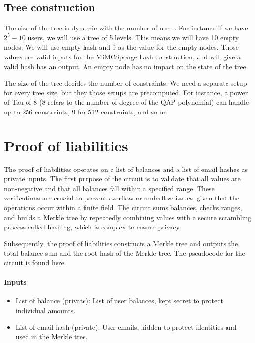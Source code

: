 \subsection{Tree construction}
The size of the tree is dynamic with the number of users. For instance if we have $2^5 - 10$ users, we will use a tree of 5 levels. This means we will
have 10 empty nodes. We will use empty hash and 0 as the value for the empty nodes. Those values are valid inputs for the MiMCSponge hash construction,
and will give a valid hash has an output. An empty node has no impact on the state of the tree.

The size of the tree decides the number of constraints. We need a separate setup for every tree size, but they those setups are precomputed. 
For instance, a power of Tau of 8 (8 refers to the number of degree of the QAP polynomial) can handle up to 256 constraints, 9 for 512 constraints, and so on.


\section{Proof of liabilities}
\label{subsec:pl}
The proof of liabilities operates on a list of balances and a list of email hashes as private inputs.
The first purpose of the circuit is to validate that all values are non-negative and that all balances fall within a specified range.
These verifications are crucial to prevent overflow or underflow issues, given that the operations occur within a finite field. 
The circuit sums balances, checks ranges, and builds a Merkle tree by repeatedly combining values with a secure scrambling process called hashing, which is complex to ensure privacy.

Subsequently, the proof of liabilities constructs a Merkle tree and outputs the total balance sum and the root hash of the Merkle tree.
The pseudocode for the circuit is found \hyperref[subsec:plc]{here}.


\paragraph{Inputs}
\begin{itemize}
   \item List of balance (private): List of user balances, kept secret to protect individual amounts.
   \item List of email hash (private): User emails, hidden to protect identities and used in the Merkle tree.
   \end{itemize}

